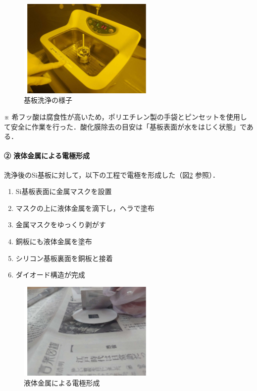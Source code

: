 \begin{figure}[H]
    \centering
    \includegraphics[width=0.6\textwidth]{figure/20250722_141148.pdf}
    \caption{基板洗浄の様子}
    \label{fig:washing_flow}
\end{figure}

※ 希フッ酸は腐食性が高いため，ポリエチレン製の手袋とピンセットを使用して安全に作業を行った．酸化膜除去の目安は「基板表面が水をはじく状態」である．


\paragraph{② 液体金属による電極形成}

洗浄後のSi基板に対して，以下の工程で電極を形成した（図\ref{fig:electrode_process} 参照）．

\begin{enumerate}
    \item Si基板表面に金属マスクを設置
    \item マスクの上に液体金属を滴下し，ヘラで塗布
    \item 金属マスクをゆっくり剥がす
    \item 銅板にも液体金属を塗布
    \item シリコン基板裏面を銅板と接着
    \item ダイオード構造が完成
\end{enumerate}

\begin{figure}[H]
    \centering
    \includegraphics[width=0.6\textwidth]{figure/20250722_155957.pdf}
    \caption{液体金属による電極形成}
    \label{fig:electrode_process}
\end{figure}

